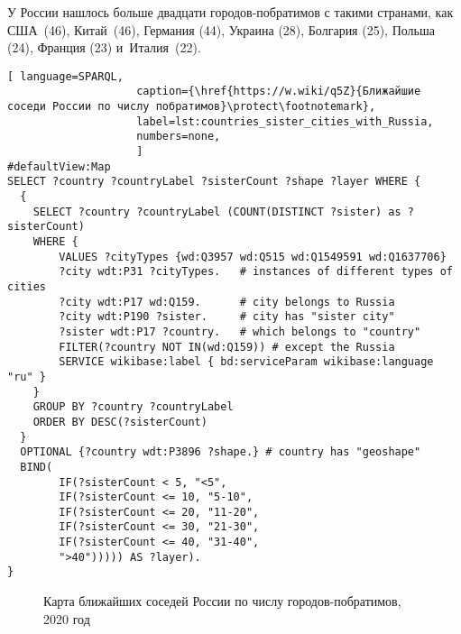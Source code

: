 У России нашлось больше двадцати городов-побратимов с такими странами, 
как США~(46), Китай~(46), Германия (44), Украина (28), Болгария (25), 
Польша (24), Франция (23) и~Италия~(22).


\begin{lstlisting}[ language=SPARQL, 
                    caption={\href{https://w.wiki/q5Z}{Ближайшие соседи России по числу побратимов}\protect\footnotemark},
                    label=lst:countries_sister_cities_with_Russia,
                    numbers=none,
                    ]
#defaultView:Map
SELECT ?country ?countryLabel ?sisterCount ?shape ?layer WHERE {
  { 
    SELECT ?country ?countryLabel (COUNT(DISTINCT ?sister) as ?sisterCount) 
    WHERE {  
        VALUES ?cityTypes {wd:Q3957 wd:Q515 wd:Q1549591 wd:Q1637706}
        ?city wdt:P31 ?cityTypes.   # instances of different types of cities
        ?city wdt:P17 wd:Q159.      # city belongs to Russia
        ?city wdt:P190 ?sister.     # city has "sister city"
        ?sister wdt:P17 ?country.   # which belongs to "country"
        FILTER(?country NOT IN(wd:Q159)) # except the Russia
        SERVICE wikibase:label { bd:serviceParam wikibase:language "ru" }
    }
    GROUP BY ?country ?countryLabel
    ORDER BY DESC(?sisterCount)
  }
  OPTIONAL {?country wdt:P3896 ?shape.} # country has "geoshape"
  BIND(
	    IF(?sisterCount < 5, "<5",
		IF(?sisterCount <= 10, "5-10",
		IF(?sisterCount <= 20, "11-20",
		IF(?sisterCount <= 30, "21-30",
		IF(?sisterCount <= 40, "31-40",
		">40"))))) AS ?layer).
}
\end{lstlisting}

\begin{figure*}
{
\setlength{\fboxsep}{0pt}%
\setlength{\fboxrule}{1pt}%
}
	\caption{Карта ближайших соседей России по числу городов-побратимов, 2020 год}
	\label{fig:Map_closest_neighbours_Russia}
\end{figure*}







